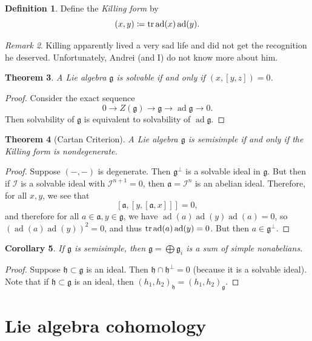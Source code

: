 \documentclass[leqno, openany]{memoir}
\newtheorem{thm}{Theorem}[section]
\newtheorem{cor}[thm]{Corollary}
\theoremstyle{definition}
\newtheorem{defn}[thm]{Definition}
\theoremstyle{remark}
\newtheorem{rmk}[thm]{Remark}
\theoremstyle{plain}
\theoremstyle{definition}
\theoremstyle{remark}
\newcommand{\mf}[1]{\mathfrak{#1}}
\newcommand{\msc}[1]{\mathscr{#1}}
\DeclareMathOperator{\ad}{ad}
\begin{document}
\begin{defn}
    Define the \textit{Killing form} by
    \[ (x,y) \coloneqq \tr \ad(x) \ad(y). \]
\end{defn}

\begin{rmk}
    Killing apparently lived a very sad life and did not get the recognition he deserved. Unfortunately, Andrei (and I) do not know more about him.
\end{rmk}

\begin{thm}
    A Lie algebra $\mf{g}$ is solvable if and only if $(x, [y,z]) = 0$.
\end{thm}

\begin{proof}
    Consider the exact sequence
    \[ 0 \to Z(\mf{g}) \to \mf{g} \to \ad \mf{g} \to 0. \]
    Then solvability of $\mf{g}$ is equivalent to solvability of $\ad \mf{g}$.
\end{proof}

\begin{thm}[Cartan Criterion]
    A Lie algebra $\mf{g}$ is semisimple if and only if the Killing form is nondegenerate.
\end{thm}

\begin{proof}
    Suppose $(-,-)$ is degenerate. Then $\mf{g}^{\perp}$ is a solvable ideal in $\mf{g}$. But then if $\msc{I}$ is a solvable ideal with $\msc{I}^{n+1} = 0$, then $\mf{a} = \msc{I}^n$ is an abelian ideal. Therefore, for all $x,y$, we see that
    \[ [\mf{a}, [y,[\mf{a}, x]]] = 0, \]
    and therefore for all $a \in \mf{a}, y \in \mf{g}$, we have $\ad (a) \ad(y) \ad(a) = 0$, so ${(\ad(a) \ad(y))}^2 = 0$, and thus $\tr \ad(a) \ad(y) = 0$. But then $a \in \mf{g}^{\perp}$.
\end{proof}

\begin{cor}
    If $\mf{g}$ is semisimple, then $\mf{g} = \bigoplus \mf{g}_i$ is a sum of simple nonabelians.
\end{cor}

\begin{proof}
    Suppose $\mf{h} \subset \mf{g}$ is an ideal. Then $\mf{h} \cap \mf{h}^{\perp} = 0$ (because it is a solvable ideal). Note that if $\mf{h} \subset \mf{g}$ is an ideal, then ${(h_1, h_2)}_{\mf{h}} = {(h_1, h_2)}_{\mf{g}}$.
\end{proof}

\section{Lie algebra cohomology}%
\label{sec:semisimple_lie_algebras}
\end{document}
